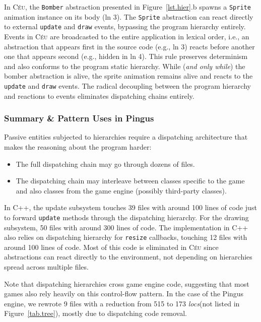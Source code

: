 \documentclass[10pt, conference, compsocconf]{IEEEtran}
\newcommand{\CEU}{\textsc{C\'{e}u}\xspace}
\newcommand{\locs}{\emph{locs}\xspace}
\newcommand{\code}[1] {{\small{\texttt{#1}}}}
\begin{document}
In \CEU, the \code{Bomber} abstraction presented in Figure~\ref{lst.hier}.b
spawns a \code{Sprite} animation instance on its body (ln 3).
%
The \code{Sprite} abstraction can react directly to external \code{update}
and \code{draw} events, bypassing the program hierarchy entirely.
Events in \CEU are broadcasted to the entire application in lexical order,
i.e., an abstraction that appears first in the source code (e.g., ln 3) reacts
before another one that appears second (e.g., hidden in ln 4).
This rule preserves determinism and also conforms to the program static
hierarchy.
While (\emph{and only while}) the bomber abstraction is alive, the sprite
animation remains alive and reacts to the \code{update} and \code{draw} events.
The radical decoupling between the program hierarchy and reactions to events
eliminates dispatching chains entirely.

\subsubsection{Summary \& Pattern Uses in Pingus}

Passive entities subjected to hierarchies require a dispatching architecture
that makes the reasoning about the program harder:

\begin{itemize}
\item The full dispatching chain may go through dozens of files.
\item The dispatching chain may interleave between classes specific to the game
      and also classes from the game engine (possibly third-party classes).
\end{itemize}

In C++, the update subsystem touches 39 files with around 100 lines of code
just to forward \code{update} methods through the dispatching hierarchy.
For the drawing subsystem, 50 files with around 300 lines of code.
The implementation in C++ also relies on dispatching hierarchy for
\code{resize} callbacks, touching 12 files with around 100 lines of code.
%
Most of this code is eliminated in \CEU since abstractions can react directly
to the environment, not depending on hierarchies spread across multiple files.

Note that dispatching hierarchies cross game engine code, suggesting that most
games also rely heavily on this control-flow pattern.
In the case of the Pingus engine, we rewrote 9 files with a reduction from 515
to 173 \locs (not listed in Figure~\ref{tab.tree}), mostly due to dispatching
code removal.
\end{document}
